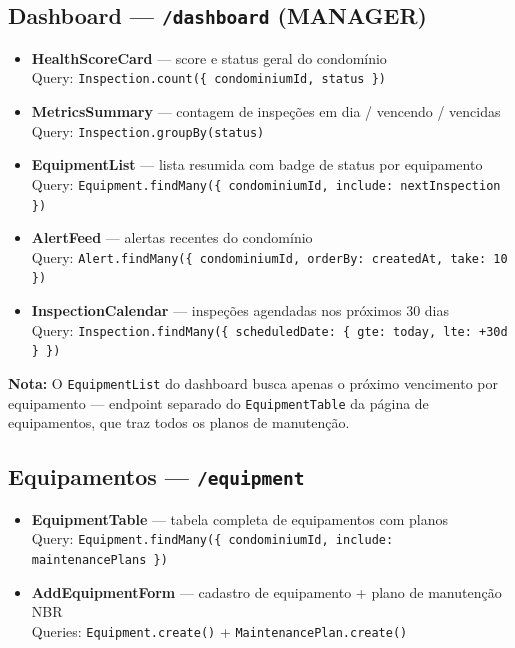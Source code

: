 \documentclass[12pt, a4paper]{article}
\begin{document}
\subsection{Dashboard — \texttt{/dashboard} (MANAGER)}

\begin{itemize}[leftmargin=1.5em]
    \item \textbf{HealthScoreCard} — score e status geral do condomínio \\
          Query: \texttt{Inspection.count(\{ condominiumId, status \})}
    \item \textbf{MetricsSummary} — contagem de inspeções em dia / vencendo / vencidas \\
          Query: \texttt{Inspection.groupBy(status)}
    \item \textbf{EquipmentList} — lista resumida com badge de status por equipamento \\
          Query: \texttt{Equipment.findMany(\{ condominiumId, include: nextInspection \})}
    \item \textbf{AlertFeed} — alertas recentes do condomínio \\
          Query: \texttt{Alert.findMany(\{ condominiumId, orderBy: createdAt, take: 10 \})}
    \item \textbf{InspectionCalendar} — inspeções agendadas nos próximos 30 dias \\
          Query: \texttt{Inspection.findMany(\{ scheduledDate: \{ gte: today, lte: +30d \} \})}
\end{itemize}

\textbf{Nota:} O \texttt{EquipmentList} do dashboard busca apenas o próximo vencimento
por equipamento — endpoint separado do \texttt{EquipmentTable} da página de equipamentos,
que traz todos os planos de manutenção.

\subsection{Equipamentos — \texttt{/equipment}}

\begin{itemize}[leftmargin=1.5em]
    \item \textbf{EquipmentTable} — tabela completa de equipamentos com planos \\
          Query: \texttt{Equipment.findMany(\{ condominiumId, include: maintenancePlans \})}
    \item \textbf{AddEquipmentForm} — cadastro de equipamento + plano de manutenção NBR \\
          Queries: \texttt{Equipment.create()} + \texttt{MaintenancePlan.create()}
\end{itemize}
\end{document}
